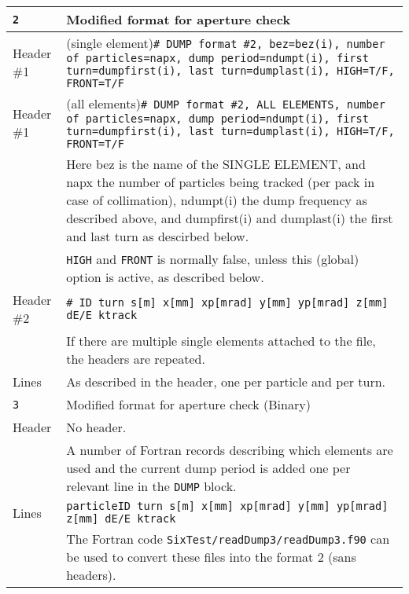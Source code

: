 \begin{center}
\begin{longtable}{|p{1.8cm}|p{13.8cm}|}
        \rowcolor{blue!15}
        \texttt{2} & Modified format for aperture check \\
        \hline
        Header \#1 & (single element)\newline \texttt{\# DUMP format \#2, bez=\textcolor{blue!90}{bez(i)}, number of particles=\textcolor{blue!90}{napx}, dump period=\textcolor{blue!90}{ndumpt(i)}, first turn=\textcolor{blue!90}{dumpfirst(i)}, last turn=\textcolor{blue!90}{dumplast(i)}, HIGH=\textcolor{blue!90}{T/F}, FRONT=\textcolor{blue!90}{T/F}} \\
        \hline
        Header \#1  & (all elements)\newline \texttt{\# DUMP format \#2, ALL ELEMENTS, number of particles=\textcolor{blue!90}{napx}, dump period=\textcolor{blue!90}{ndumpt(i)}, first turn=\textcolor{blue!90}{dumpfirst(i)}, last turn=\textcolor{blue!90}{dumplast(i)}, HIGH=\textcolor{blue!90}{T/F}, FRONT=\textcolor{blue!90}{T/F}}\vspace{1mm} \\
                    & Here \textcolor{blue!90}{bez} is the name of the SINGLE ELEMENT, and \textcolor{blue!90}{napx} the number of particles being tracked (per pack in case of collimation), \textcolor{blue!90}{ndumpt(i)} the dump frequency as described above, and \textcolor{blue!90}{dumpfirst(i)} and \textcolor{blue!90}{dumplast(i)} the first and last turn as descirbed below.\vspace{1mm} \\
                    & \texttt{HIGH} and \texttt{FRONT} is normally false, unless this (global) option is active, as described below.\\
        \hline
        Header \#2 & \texttt{\# ID turn s[m] x[mm] xp[mrad] y[mm] yp[mrad] z[mm] dE/E ktrack}\vspace{1mm} \\
                   & If there are multiple single elements attached to the file, the headers are repeated.\\
        \hline
        Lines      & As described in the header, one per particle and per turn. \\
        \hline
        
        \rowcolor{blue!15}
        \texttt{3} & Modified format for aperture check (Binary) \\
        \hline
        Header & No header.\vspace{1mm}\\
               & A number of Fortran records describing which elements are used and the current dump period is added one per relevant line in the \texttt{DUMP} block.\\
        \hline
        Lines  & \texttt{particleID turn s[m] x[mm] xp[mrad] y[mm] yp[mrad] z[mm] dE/E ktrack} \\
               & The Fortran code \texttt{SixTest/readDump3/readDump3.f90} can be used to convert these files into the format 2 (sans headers). \\
        \hline
        

\end{longtable}
\end{center}
